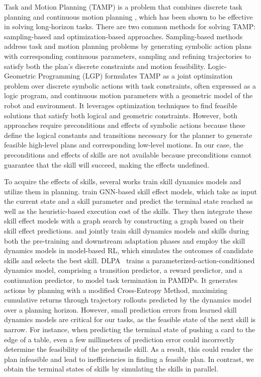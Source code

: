 Task and Motion Planning (TAMP) is a problem that combines discrete task planning and continuous motion planning \cite{garrett2020pddlstream, garrett2021integrated}, which has been shown to be effective in solving long-horizon tasks. There are two common methods for solving TAMP: sampling-based and optimization-based approaches. Sampling-based methods \cite{garrett2018ffrob, garrett2020pddlstream, ren2024extended} address task and motion planning problems by generating symbolic action plans with corresponding continuous parameters, sampling and refining trajectories to satisfy both the plan's discrete constraints and motion feasibility. Logic-Geometric Programming (LGP) \cite{toussaint2015logic, toussaint2018differentiable, migimatsu2020object} formulates TAMP as a joint optimization problem over discrete symbolic actions with task constraints, often expressed as a logic program, and continuous motion parameters with a geometric model of the robot and environment. It leverages optimization techniques to find feasible solutions that satisfy both logical and geometric constraints. However, both approaches require preconditions and effects of symbolic actions because these define the logical constants and transitions necessary for the planner to generate feasible high-level plans and corresponding low-level motions. In our case, the preconditions and effects of skills are not available because preconditions cannot guarantee that the skill will succeed, making the effects undefined.

To acquire the effects of skills, several works \cite{liang2022search, shi2023skill, zhang2024model, lidexdeform} train skill dynamics models and utilize them in planning. \citet{liang2022search} train GNN-based skill effect models, which take as input the current state and a skill parameter and predict the terminal state reached as well as the heuristic-based execution cost of the skills. They then integrate these skill effect models with a graph search by constructing a graph based on their skill effect predictions. \citet{shi2023skill} and \citet{lidexdeform} jointly train skill dynamics models and skills during both the pre-training and downstream adaptation phases and employ the skill dynamics models in model-based RL, which simulates the outcomes of candidate skills and selects the best skill. DLPA~\cite{zhang2024model} trains a parameterized-action-conditioned dynamics model, comprising a transition predictor, a reward predictor, and a continuation predictor, to model task termination in PAMDPs. It generates actions by planning with a modified Cross-Entropy Method, maximizing cumulative returns through trajectory rollouts predicted by the dynamics model over a planning horizon. However, small prediction errors from learned skill dynamics models are critical for our tasks, as the feasible state of the next skill is narrow. For instance, when predicting the terminal state of pushing a card to the edge of a table, even a few millimeters of prediction error could incorrectly determine the feasibility of the prehensile skill. As a result, this could render the plan infeasible and lead to inefficiencies in finding a feasible plan. In contrast, we obtain the terminal states of skills by simulating the skills in parallel.

